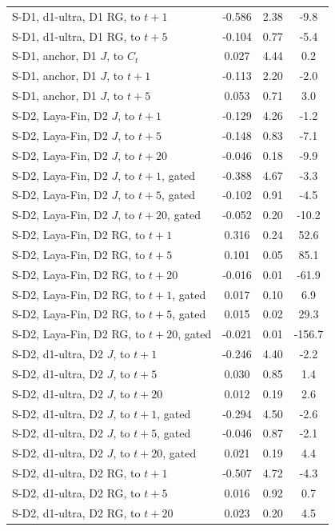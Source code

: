 \begin{longtable}{@{}lS[table-format=-1.3]S[table-format=1.2]S[table-format=-3.1]@{}}
S-D1, d1-ultra, D1 RG, to $t{+}1$ & -0.586 & 2.38 & -9.8 \\
S-D1, d1-ultra, D1 RG, to $t{+}5$ & -0.104 & 0.77 & -5.4 \\
S-D1, anchor, D1 $J$, to $C_t$ & 0.027 & 4.44 & 0.2 \\
S-D1, anchor, D1 $J$, to $t{+}1$ & -0.113 & 2.20 & -2.0 \\
S-D1, anchor, D1 $J$, to $t{+}5$ & 0.053 & 0.71 & 3.0 \\
S-D2, Laya-Fin, D2 $J$, to $t{+}1$ & -0.129 & 4.26 & -1.2 \\
S-D2, Laya-Fin, D2 $J$, to $t{+}5$ & -0.148 & 0.83 & -7.1 \\
S-D2, Laya-Fin, D2 $J$, to $t{+}20$ & -0.046 & 0.18 & -9.9 \\
S-D2, Laya-Fin, D2 $J$, to $t{+}1$, gated & -0.388 & 4.67 & -3.3 \\
S-D2, Laya-Fin, D2 $J$, to $t{+}5$, gated & -0.102 & 0.91 & -4.5 \\
S-D2, Laya-Fin, D2 $J$, to $t{+}20$, gated & -0.052 & 0.20 & -10.2 \\
S-D2, Laya-Fin, D2 RG, to $t{+}1$ & 0.316 & 0.24 & 52.6 \\
S-D2, Laya-Fin, D2 RG, to $t{+}5$ & 0.101 & 0.05 & 85.1 \\
S-D2, Laya-Fin, D2 RG, to $t{+}20$ & -0.016 & 0.01 & -61.9 \\
S-D2, Laya-Fin, D2 RG, to $t{+}1$, gated & 0.017 & 0.10 & 6.9 \\
S-D2, Laya-Fin, D2 RG, to $t{+}5$, gated & 0.015 & 0.02 & 29.3 \\
S-D2, Laya-Fin, D2 RG, to $t{+}20$, gated & -0.021 & 0.01 & -156.7 \\
S-D2, d1-ultra, D2 $J$, to $t{+}1$ & -0.246 & 4.40 & -2.2 \\
S-D2, d1-ultra, D2 $J$, to $t{+}5$ & 0.030 & 0.85 & 1.4 \\
S-D2, d1-ultra, D2 $J$, to $t{+}20$ & 0.012 & 0.19 & 2.6 \\
S-D2, d1-ultra, D2 $J$, to $t{+}1$, gated & -0.294 & 4.50 & -2.6 \\
S-D2, d1-ultra, D2 $J$, to $t{+}5$, gated & -0.046 & 0.87 & -2.1 \\
S-D2, d1-ultra, D2 $J$, to $t{+}20$, gated & 0.021 & 0.19 & 4.4 \\
S-D2, d1-ultra, D2 RG, to $t{+}1$ & -0.507 & 4.72 & -4.3 \\
S-D2, d1-ultra, D2 RG, to $t{+}5$ & 0.016 & 0.92 & 0.7 \\
S-D2, d1-ultra, D2 RG, to $t{+}20$ & 0.023 & 0.20 & 4.5 \\

\end{longtable}
